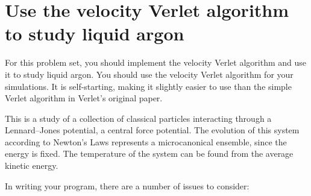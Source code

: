 \section{Use the velocity Verlet algorithm to study liquid argon}

\Question For this problem set, you should implement the velocity Verlet algorithm and use
it to study liquid argon. You should use the
velocity Verlet algorithm for your simulations. It is self-starting, making it slightly
easier to use than the simple Verlet algorithm in Verlet's original paper.

This is a study of a collection of classical particles interacting through a Lennard--Jones
potential, a central force potential. The evolution of this system according to Newton's
Laws represents a microcanonical ensemble, since the energy is fixed. The temperature of the
system can be found from the average kinetic energy.

In writing your program, there are a number of issues to consider:

